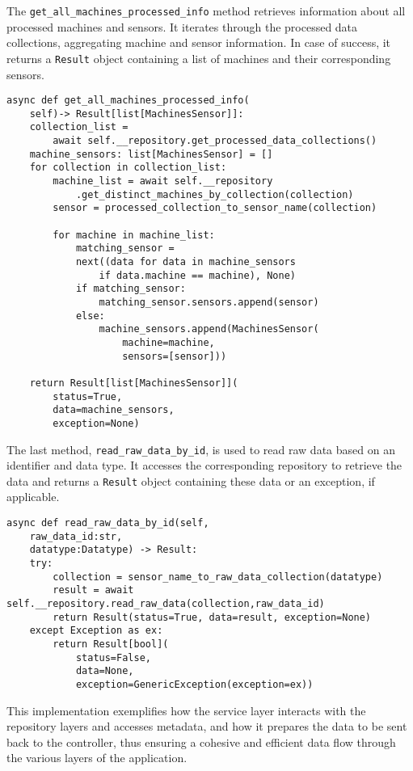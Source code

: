 The \texttt{get\_all\_machines\_processed\_info} method retrieves information about all processed machines and sensors. It iterates through the processed data collections, aggregating machine and sensor information. In case of success, it returns a \texttt{Result} object containing a list of machines and their corresponding sensors.

\begin{Verbatim}[fontsize=\small, baselinestretch=0.6]
async def get_all_machines_processed_info(
    self)-> Result[list[MachinesSensor]]:
    collection_list = 
        await self.__repository.get_processed_data_collections()
    machine_sensors: list[MachinesSensor] = []
    for collection in collection_list:
        machine_list = await self.__repository
            .get_distinct_machines_by_collection(collection)
        sensor = processed_collection_to_sensor_name(collection)

        for machine in machine_list:
            matching_sensor = 
            next((data for data in machine_sensors 
                if data.machine == machine), None)
            if matching_sensor:
                matching_sensor.sensors.append(sensor)
            else:
                machine_sensors.append(MachinesSensor(
                    machine=machine,
                    sensors=[sensor]))
    
    return Result[list[MachinesSensor]](
        status=True,
        data=machine_sensors,
        exception=None)
\end{Verbatim}

The last method, \texttt{read\_raw\_data\_by\_id}, is used to read raw data based on an identifier and data type. It accesses the corresponding repository to retrieve the data and returns a \texttt{Result} object containing these data or an exception, if applicable.
\begin{Verbatim}[fontsize=\small, baselinestretch=0.6]
async def read_raw_data_by_id(self,
    raw_data_id:str,
    datatype:Datatype) -> Result:
    try:
        collection = sensor_name_to_raw_data_collection(datatype)
        result = await self.__repository.read_raw_data(collection,raw_data_id)
        return Result(status=True, data=result, exception=None) 
    except Exception as ex:
        return Result[bool](
            status=False,
            data=None,
            exception=GenericException(exception=ex)) 

\end{Verbatim}
This implementation exemplifies how the service layer interacts with the repository layers and accesses metadata, and how it prepares the data to be sent back to the controller, thus ensuring a cohesive and efficient data flow through the various layers of the application.

